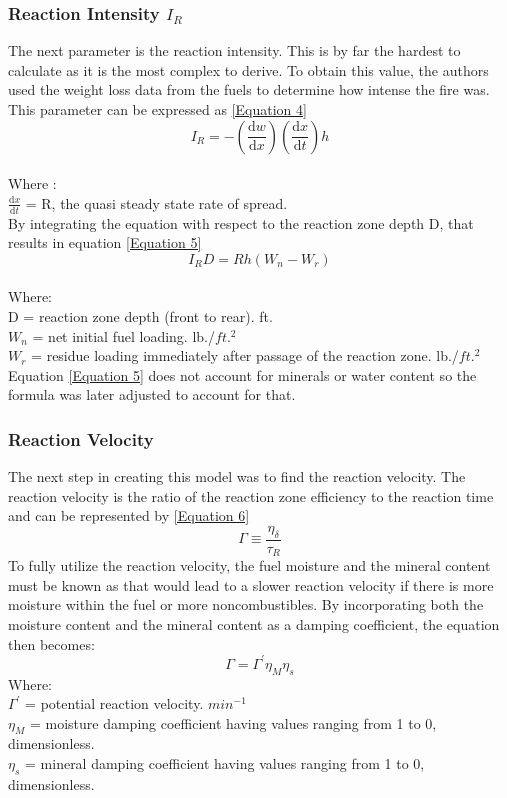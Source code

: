 \documentclass{article}
\begin{document}
\subsubsection{Reaction Intensity $I_R$}
\indent The next parameter is the reaction intensity. This is by far the hardest to calculate as it is the most complex to derive. To obtain this value, the authors used the weight loss data from the fuels to determine how intense the fire was. This parameter can be expressed as \ref{Equation 4}
\begin{equation}
	\label{Equation 4}
	I_R = - (\frac {\mathrm {d}w} {\mathrm{d} x}) (\frac {\mathrm {d}x} {\mathrm{d} t}) h 
\end{equation}\\
Where :\\
$\frac {\mathrm {d}x} {\mathrm{d} t}$ = R, the quasi steady state rate of spread. \\
\indent By integrating the equation with respect to the reaction zone depth D, that results in equation \ref{Equation 5}
\begin{equation}
	\label{Equation 5}
	I_R D = Rh (W_n - W_r)
\end{equation}\\
Where: \\
D = reaction zone depth (front to rear). ft. \\
$W_n$ = net initial fuel loading. lb./$ft. ^ 2$ \\
$W_r$ = residue loading immediately after passage of the reaction zone. lb./$ft. ^ 2$ \\
\indent Equation \ref{Equation 5} does not account for minerals or water content so the formula was later adjusted to account for that. \\
\subsubsection{Reaction Velocity}
\indent The next step in creating this model was to find the reaction velocity. The reaction velocity is the ratio of the reaction zone efficiency to the reaction time and can be represented by \ref{Equation 6}
\begin{equation}
	\label{Equation 6}
	\Gamma \equiv \frac {\eta _ \delta} {\tau _ R}
\end{equation}
\indent To fully utilize the reaction velocity, the fuel moisture and the mineral content must be known as that would lead to a slower reaction velocity if there is more moisture within the fuel or more noncombustibles. By incorporating both the moisture content and the mineral content as a damping coefficient, the equation then becomes: 
\begin{equation}
	\label{Equation 7}
	\Gamma = \Gamma ^ {'} \eta _ M \eta _ s
\end{equation}
Where: \\
 $\Gamma ^ {'}$ = potential reaction velocity. $min ^ {-1}$ \\ 
 $\eta _ M$ = moisture damping coefficient having values ranging from 1 to 0, dimensionless. \\
 $\eta _ s$ = mineral damping coefficient having values ranging from 1 to 0, dimensionless. \\
\end{document}
